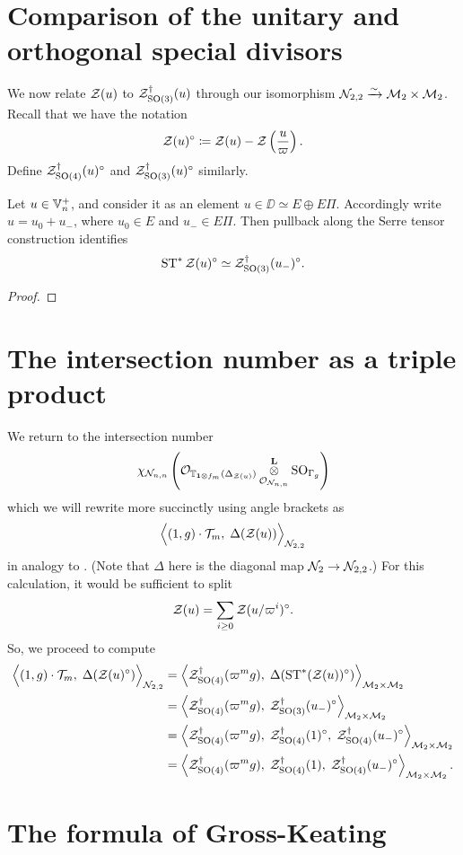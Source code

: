\section{Comparison of the unitary and orthogonal special divisors}
We now relate $\mathcal Z(u)$ to $\mathcal Z^{\dagger}_{\operatorname{SO}(3)}(u)$ through our
isomorphism $\mathcal N_{2,2} \xrightarrow{\sim} \mathcal M_2 \times \mathcal M_2$.
Recall that we have the notation
\[ \mathcal Z(u)^\circ \coloneqq \mathcal Z(u) - \mathcal Z\left( \frac{u}{\varpi} \right). \]
Define $\mathcal Z^{\dagger}_{\operatorname{SO}(4)}(u)^\circ$ and $\mathcal Z^{\dagger}_{\operatorname{SO}(3)}(u)^\circ$ similarly.

\begin{lemma}
  Let $u \in \mathbb V_n^+$, and consider it as an element $u \in \DD \simeq E \oplus E \Pi$.
  Accordingly write $u = u_0 + u_-$, where $u_0 \in E$ and $u_- \in E \Pi$.
  Then pullback along the Serre tensor construction identifies
  \[ \operatorname{ST}^\ast \mathcal Z(u)^\circ \simeq \mathcal Z^{\dagger}_{\operatorname{SO}(3)}(u_-)^\circ. \]
\end{lemma}
\begin{proof}
\end{proof}


\section{The intersection number as a triple product}
We return to the intersection number
\[ \chi_{\mathcal N_{n,n}} \left(
      \mathcal{O}_{\mathbb T_{\mathbf{1} \otimes f_m}(\Delta_{\mathcal Z(u)})}
      \mathop{\otimes}^{\mathbf{L}}_{\mathcal{O}_{\mathcal N_{n,n}}} \operatorname{SO}_{\Gamma_g} \right) \]
which we will rewrite more succinctly using angle brackets as
\[ \Big\langle (1,g) \cdot \mathcal{T}_m, \; \Delta(\mathcal Z(u)) \Big\rangle_{\mathcal N_{2,2}} \]
in analogy to \cite[\S6.1]{ref:AFLspherical}.
(Note that $\Delta$ here is the diagonal map $\mathcal N_2 \to \mathcal N_{2,2}$.)
For this calculation, it would be sufficient to split
\[ \mathcal Z(u) = \sum_{i \ge 0} \mathcal Z(u/\varpi^i)^\circ. \]
So, we proceed to compute
\begin{align*}
  \Big\langle (1,g) \cdot \mathcal{T}_m, \; \Delta(\mathcal Z(u)^\circ) \Big\rangle_{\mathcal N_{2,2}}
  &= \left< \mathcal Z^{\dagger}_{\operatorname{SO}(4)}(\varpi^m g), \; \Delta(\operatorname{ST}^\ast(\mathcal Z(u))^\circ) \right>_{\mathcal M_2 \times \mathcal M_2} \\
  &= \left< \mathcal Z^{\dagger}_{\operatorname{SO}(4)}(\varpi^m g), \; \mathcal Z^{\dagger}_{\operatorname{SO}(3)}(u_-)^\circ \right>_{\mathcal M_2 \times \mathcal M_2} \\
  &= \left< \mathcal Z^{\dagger}_{\operatorname{SO}(4)}(\varpi^m g), \; \mathcal Z^{\dagger}_{\operatorname{SO}(4)}(1)^\circ, \; \mathcal Z^{\dagger}_{\operatorname{SO}(4)}(u_-)^\circ \right>_{\mathcal M_2 \times \mathcal M_2} \\
  &= \left< \mathcal Z^{\dagger}_{\operatorname{SO}(4)}(\varpi^m g), \; \mathcal Z^{\dagger}_{\operatorname{SO}(4)}(1), \; \mathcal Z^{\dagger}_{\operatorname{SO}(4)}(u_-)^\circ \right>_{\mathcal M_2 \times \mathcal M_2}.
\end{align*}

\section{The formula of Gross-Keating}
\begin{theorem}
\end{theorem}
